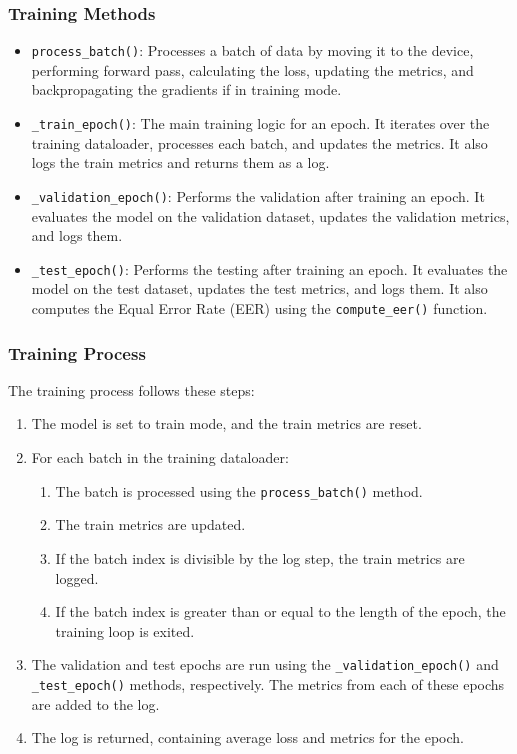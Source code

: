 \documentclass[a4paper]{article}
\begin{document}
\subsubsection{Training Methods}

\begin{itemize}
    \item \texttt{process\_batch()}: Processes a batch of data by moving it to the device, performing forward pass, calculating the loss, updating the metrics, and backpropagating the gradients if in training mode.
    \item \texttt{\_train\_epoch()}: The main training logic for an epoch. It iterates over the training dataloader, processes each batch, and updates the metrics. It also logs the train metrics and returns them as a log.
    \item \texttt{\_validation\_epoch()}: Performs the validation after training an epoch. It evaluates the model on the validation dataset, updates the validation metrics, and logs them.
    \item \texttt{\_test\_epoch()}: Performs the testing after training an epoch. It evaluates the model on the test dataset, updates the test metrics, and logs them. It also computes the Equal Error Rate (EER) using the \texttt{compute\_eer()} function.
\end{itemize}

\subsubsection{Training Process}

The training process follows these steps:

\begin{enumerate}
    \item The model is set to train mode, and the train metrics are reset.
    \item For each batch in the training dataloader:
    \begin{enumerate}
        \item The batch is processed using the \texttt{process\_batch()} method.
        \item The train metrics are updated.
        \item If the batch index is divisible by the log step, the train metrics are logged.
        \item If the batch index is greater than or equal to the length of the epoch, the training loop is exited.
    \end{enumerate}
    \item The validation and test epochs are run using the \texttt{\_validation\_epoch()} and \texttt{\_test\_epoch()} methods, respectively. The metrics from each of these epochs are added to the log.
    \item The log is returned, containing average loss and metrics for the epoch.
\end{enumerate}
\end{document}
